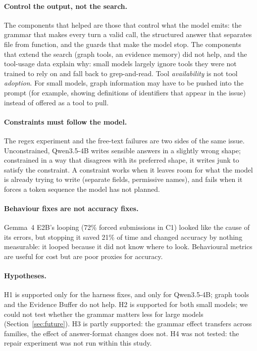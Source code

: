 \documentclass[11pt]{article}
\newcommand{\Gm}{Gemma~4 E2B}
\newcommand{\Qw}{Qwen3.5-4B}
\begin{document}
\paragraph{Control the output, not the search.}
The components that helped are those that control what the model emits: the grammar that makes every turn a valid call, the structured answer that separates file from function, and the guards that make the model stop.
The components that extend the search (graph tools, an evidence memory) did not help, and the tool-usage data explain why: small models largely ignore tools they were not trained to rely on and fall back to grep-and-read.
Tool \emph{availability} is not tool \emph{adoption}.
For small models, graph information may have to be pushed into the prompt (for example, showing definitions of identifiers that appear in the issue) instead of offered as a tool to pull.

\paragraph{Constraints must follow the model.}
The regex experiment and the free-text failures are two sides of the same issue.
Unconstrained, \Qw{} writes sensible answers in a slightly wrong shape; constrained in a way that disagrees with its preferred shape, it writes junk to satisfy the constraint.
A constraint works when it leaves room for what the model is already trying to write (separate fields, permissive names), and fails when it forces a token sequence the model has not planned.

\paragraph{Behaviour fixes are not accuracy fixes.}
\Gm{}'s looping (72\% forced submissions in C1) looked like the cause of its errors, but stopping it saved 21\% of time and changed accuracy by nothing measurable: it looped because it did not know where to look.
Behavioural metrics are useful for cost but are poor proxies for accuracy.

\paragraph{Hypotheses.}
H1 is supported only for the harness fixes, and only for \Qw{}; graph tools and the Evidence Buffer do not help.
H2 is supported for both small models; we could not test whether the grammar matters less for large models (Section~\ref{sec:future}).
H3 is partly supported: the grammar effect transfers across families, the effect of answer-format changes does not.
H4 was not tested: the repair experiment was not run within this study.
\end{document}
